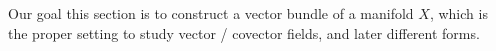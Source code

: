 \documentclass[../main-manifolds.tex]{subfiles}
\begin{document}



% 

Our goal this section is to construct a vector bundle of a manifold $X$, which is the proper setting to study vector / covector fields, and later different forms. %



\end{document}
